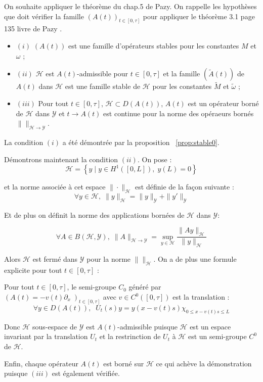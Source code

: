 \documentclass[a4paper]{article}
\begin{document}
\begin{preuve}
	On souhaite appliquer le théorème du chap.5 de Pazy.
	On rappelle les hypothèses que doit vérifier la famille $(A(t))_{t \in [0,\tau]}$ pour appliquer 
	le théorème 3.1 page 135 livre de Pazy \cite{APazy}.
	\begin{itemize}
		\item $(i)$ $(A(t))$ est une famille d'opérateurs stables pour les constantes $M$ et $\omega$ ;
		\item $(ii)$ $\mathscr{H}$ est $A(t)$-admissible pour $t \in [0,\tau]$ et la famille $(\tilde{A}(t))$
		de $A(t)$ dans $\mathscr{H}$ est une famille stable de $\mathscr{H}$ 
		pour les constantes $\tilde{M}$ et $\tilde{\omega}$ ;
		\item $(iii)$ Pour tout $t \in[0,\tau]$, $\mathscr{H} \subset D(A(t))$, $A(t)$ est un opérateur borné
		de $\mathscr{H}$ dans $\mathscr{Y}$ et $t \to A(t)$ est continue 
		pour la norme des opéraeurs bornés $\| \|_{\mathscr{H}\to \mathscr{Y}}$.
	\end{itemize}
	
	\vspace{0.3cm}
	La condition $(i)$ a été démontrée par la proposition ~\ref{prop:stable0}.
	
	\vspace{0.3cm}
	Démontrons maintenant la condition $(ii)$.
	On pose :
	\[\mathscr{H} = \left\{ y \; | \; y\in H^1([0,L]), \; y(L)=0 \right\} \]
	 
	  et la norme associée à cet espace $\| \cdot \|_{\mathscr{H}}$ est définie de la façon suivante :
	\[ \forall y \in \mathscr{H}, \; \|y\|_{\mathscr{H}} = \|y\|_{\mathscr{Y}} + \|y'\|_{\mathscr{Y}} \]
	
	Et de plus on définit la norme des applications bornées de $\mathscr{H}$ dans $\mathscr{Y}$:
	
	\[ \forall A \in B(\mathscr{H},\mathscr{Y}), 
	\; \| A \|_{\mathscr{H}\to \mathscr{Y}} =\sup_{y\in\mathscr{H}} \frac{\|Ay\|_{\mathscr{H}}}{\|y\|_{\mathscr{H}}} \]
	
	Alors $\mathscr{H}$ est fermé dans $\mathscr{Y}$ pour la norme $\| \|_{\mathscr{H}}$.
	On a de plus une formule explicite pour tout $t\in [0,\tau]$ :
	
	\begin{lemme}
		Pour tout $t\in[0,\tau]$, le semi-groupe $C_0$ généré par $(A(t)= - v(t)\partial_x \;)_{t \in [0,\tau]}$
		avec $v \in C^0([0,\tau])$ est la translation :
		\[ \forall y \in D(A(t)), \; \; U_t(s)y = y(x - v(t)s)\chi_{0\leq x-v(t)s \leq L} \]
	\end{lemme}
	
	Donc $\mathscr{H}$ sous-espace de $\mathscr{Y}$ est $A(t)$-admissible 
	puisque $\mathscr{H}$ est un espace invariant par la translation $U_t$
	et la restrinction de $U_t$ à $\mathscr{H}$ est un semi-groupe $C^0$ de $\mathscr{H}$.
	
	Enfin, chaque opérateur $A(t)$ est borné sur $\mathscr{H}$ ce qui achève la démonstration puisque $(iii)$ est également vérifiée.
\end{preuve}
\end{document}
